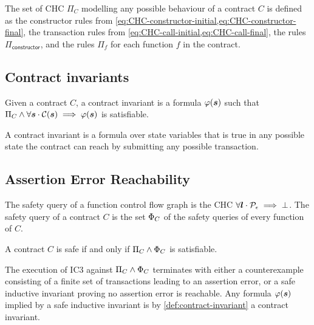 The set of CHC $\Pi_C$ modelling any possible behaviour of
a contract $C$ is defined as the constructor rules from
\cref{eq:CHC-constructor-initial,eq:CHC-constructor-final},
the transaction rules from 
\cref{eq:CHC-call-initial,eq:CHC-call-final}, 
the rules $\Pi_\mathsf{constructor}$, and
the rules $\Pi_f$ for each function $f$ in the contract.

\subsection{Contract invariants}
\begin{definition}
\label{def:contract-invariant}
	Given a contract $C$, a contract invariant is a formula
	$\varphi(\boldsymbol{s})$ such that \mbox{$\Pi_C\wedge\forall\boldsymbol{s}\cdot\mathcal{C}(\boldsymbol{s})\implies\varphi(\boldsymbol{s})$} is satisfiable.
\end{definition}
%
A contract invariant is a formula over state variables
that is true in any possible state the contract can reach
by submitting any possible transaction.

\subsection{Assertion Error Reachability}

\begin{definition}
	The safety query of a function control flow graph
	is the CHC
	\mbox{$\forall\boldsymbol{l}\cdot\mathcal{P}_\epsilon\implies\bot$}.
	The safety query of a contract $C$ is the set $\Phi_C$ of 
	the safety queries of every function of $C$.
\end{definition}



\begin{definition}
	A contract $C$ is safe if and only if
	\mbox{$\Pi_C\wedge\Phi_C$} is satisfiable.
\end{definition}

The execution of IC3 against \mbox{$\Pi_C\wedge\Phi_C$}
terminates with either a counterexample consisting of a
finite set of transactions leading to an assertion error,
or a safe inductive invariant proving no assertion error
is reachable. Any formula $\varphi(\boldsymbol{s})$ implied by a
safe inductive invariant is by \cref{def:contract-invariant}
a contract invariant.
